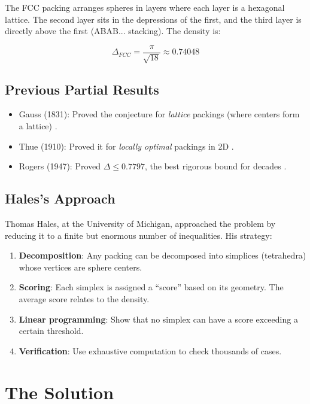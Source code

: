 The FCC packing arranges spheres in layers where each layer is a hexagonal lattice. The second layer sits in the depressions of the first, and the third layer is directly above the first (ABAB... stacking). The density is:

\begin{equation}
\Delta_{FCC} = \frac{\pi}{\sqrt{18}} \approx 0.74048
\end{equation}

\subsection{Previous Partial Results}

\begin{itemize}
\item Gauss (1831): Proved the conjecture for \emph{lattice} packings (where centers form a lattice) \cite{gauss1831}.
\item Thue (1910): Proved it for \emph{locally optimal} packings in 2D \cite{thue1910}.
\item Rogers (1947): Proved $\Delta \leq 0.7797$, the best rigorous bound for decades \cite{rogers1947}.
\end{itemize}

\subsection{Hales's Approach}

Thomas Hales, at the University of Michigan, approached the problem by reducing it to a finite but enormous number of inequalities. His strategy:

\begin{enumerate}
\item \textbf{Decomposition}: Any packing can be decomposed into simplices (tetrahedra) whose vertices are sphere centers.
\item \textbf{Scoring}: Each simplex is assigned a ``score'' based on its geometry. The average score relates to the density.
\item \textbf{Linear programming}: Show that no simplex can have a score exceeding a certain threshold.
\item \textbf{Verification}: Use exhaustive computation to check thousands of cases.
\end{enumerate}

\section{The Solution}

